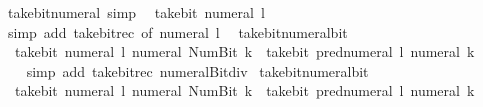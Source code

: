 \begin{isabellebody}
\ take{\isacharunderscore}{\kern0pt}bit{\isacharunderscore}{\kern0pt}numeral{\isacharunderscore}{\kern0pt}{}\ {\isacharbrackleft}{\kern0pt}simp{\isacharbrackright}{\kern0pt}{\isacharcolon}{\kern0pt}\isanewline
\ \ {\isacartoucheopen}take{\isacharunderscore}{\kern0pt}bit\ {\isacharparenleft}{\kern0pt}numeral\ l{\isacharparenright}{\kern0pt}\ {}\ {\isacharequal}{\kern0pt}\ {}{\isacartoucheclose}\isanewline
%
\isadelimproof
\ \ %
\endisadelimproof
%
\isatagproof
{}\isamarkupfalse%
\ {\isacharparenleft}{\kern0pt}simp\ add{\isacharcolon}{\kern0pt}\ take{\isacharunderscore}{\kern0pt}bit{\isacharunderscore}{\kern0pt}rec\ {\isacharbrackleft}{\kern0pt}of\ {\isacartoucheopen}numeral\ l{\isacartoucheclose}\ {}{\isacharbrackright}{\kern0pt}{\isacharparenright}{\kern0pt}%
\endisatagproof
{\isafoldproof}%
%
\isadelimproof
\isanewline
%
\endisadelimproof
\isanewline
{}\isamarkupfalse%
\ take{\isacharunderscore}{\kern0pt}bit{\isacharunderscore}{\kern0pt}numeral{\isacharunderscore}{\kern0pt}bit{}{\isacharcolon}{\kern0pt}\isanewline
\ \ {\isacartoucheopen}take{\isacharunderscore}{\kern0pt}bit\ {\isacharparenleft}{\kern0pt}numeral\ l{\isacharparenright}{\kern0pt}\ {\isacharparenleft}{\kern0pt}numeral\ {\isacharparenleft}{\kern0pt}Num{\isachardot}{\kern0pt}Bit{}\ k{\isacharparenright}{\kern0pt}{\isacharparenright}{\kern0pt}\ {\isacharequal}{\kern0pt}\ take{\isacharunderscore}{\kern0pt}bit\ {\isacharparenleft}{\kern0pt}pred{\isacharunderscore}{\kern0pt}numeral\ l{\isacharparenright}{\kern0pt}\ {\isacharparenleft}{\kern0pt}numeral\ k{\isacharparenright}{\kern0pt}\ {\isacharasterisk}{\kern0pt}\ {}{\isacartoucheclose}\isanewline
%
\isadelimproof
\ \ %
\endisadelimproof
%
\isatagproof
{}\isamarkupfalse%
\ {\isacharparenleft}{\kern0pt}simp\ add{\isacharcolon}{\kern0pt}\ take{\isacharunderscore}{\kern0pt}bit{\isacharunderscore}{\kern0pt}rec\ numeral{\isacharunderscore}{\kern0pt}Bit{}{\isacharunderscore}{\kern0pt}div{\isacharunderscore}{\kern0pt}{}{\isacharparenright}{\kern0pt}%
\endisatagproof
{\isafoldproof}%
%
\isadelimproof
\isanewline
%
\endisadelimproof
\isanewline
{}\isamarkupfalse%
\ take{\isacharunderscore}{\kern0pt}bit{\isacharunderscore}{\kern0pt}numeral{\isacharunderscore}{\kern0pt}bit{}{\isacharcolon}{\kern0pt}\isanewline
\ \ {\isacartoucheopen}take{\isacharunderscore}{\kern0pt}bit\ {\isacharparenleft}{\kern0pt}numeral\ l{\isacharparenright}{\kern0pt}\ {\isacharparenleft}{\kern0pt}numeral\ {\isacharparenleft}{\kern0pt}Num{\isachardot}{\kern0pt}Bit{}\ k{\isacharparenright}{\kern0pt}{\isacharparenright}{\kern0pt}\ {\isacharequal}{\kern0pt}\ take{\isacharunderscore}{\kern0pt}bit\ {\isacharparenleft}{\kern0pt}pred{\isacharunderscore}{\kern0pt}numeral\ l{\isacharparenright}{\kern0pt}\ {\isacharparenleft}{\kern0pt}numeral\ k{\isacharparenright}{\kern0pt}\ {\isacharasterisk}{\kern0pt}\ {}\ {\isacharplus}{\kern0pt}\ {}{\isacartoucheclose}\isanewline

\end{isabellebody}
